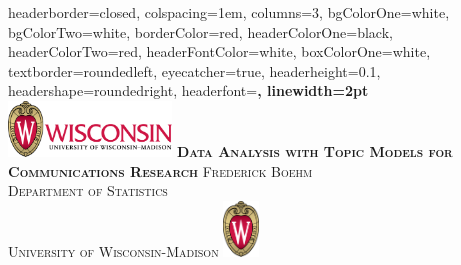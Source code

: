 \documentclass[landscape,a0paper,fontscale=0.285]{baposter} %
\begin{document}
\begin{poster}
{
headerborder=closed, %
colspacing=1em, %
columns=3,
bgColorOne=white, %
bgColorTwo=white, %
borderColor=red, %
headerColorOne=black, %
headerColorTwo=red, %
headerFontColor=white, %
boxColorOne=white, %
textborder=roundedleft, %
eyecatcher=true, %
headerheight=0.1\textheight, %
headershape=roundedright, %
headerfont=\Large\bf\textsc, %
linewidth=2pt %
}
%
{\includegraphics[height=4em]{UWlogo_fl_4c.png}} %
{\bf\textsc{Data Analysis with Topic Models for Communications Research}}%
{\textsc{ Frederick Boehm  \hspace{12pt} \\ Department of Statistics\\
University of Wisconsin-Madison}} %
{\includegraphics[height=4em]{UWCrest_4c.png}} %


\end{poster}
\end{document}
